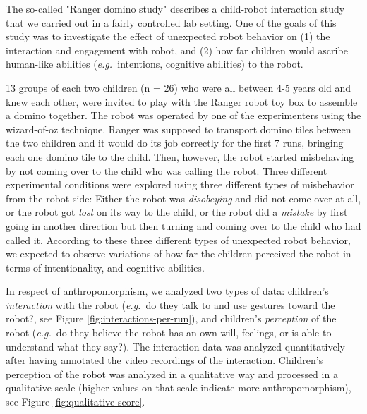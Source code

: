 \documentclass{frontiersSCNS} %
\newcommand{\eg}{{\textit{e.g.~}}}
\begin{document}
The so-called "Ranger domino study" describes a child-robot interaction study
that we carried out in a fairly controlled lab setting. One of the goals of this
study was to investigate the effect of unexpected robot behavior on (1) the
interaction and engagement with robot, and (2) how far children would ascribe
human-like abilities (\eg intentions, cognitive abilities) to the robot.

13 groups of each two children (n = 26) who were all between 4-5 years old and
knew each other, were invited to play with the Ranger
robot toy box \citep{fink2014which} to assemble a domino together. The robot
was operated by one of the experimenters using the wizard-of-oz technique.
Ranger was supposed to transport domino tiles between the two children and it
would do its job correctly for the first 7 runs, bringing each one domino tile to the child. Then, however, the
robot started misbehaving by not coming over to the child who was calling the 
robot. Three different experimental conditions were explored using three different 
types of misbehavior from the robot side:
Either the robot was \textit{disobeying} and did not come over at all, or 
the robot got \textit{lost} on its way to the child, or the robot did a 
\textit{mistake} by first going in another direction but then turning and 
coming over to the child who had called it.
According to these three different types of unexpected robot behavior, we 
expected to observe variations of how far the children perceived the 
robot in terms of intentionality, and cognitive abilities.

In respect of anthropomorphism, we analyzed two types of data: children's 
\textit{interaction} with the robot (\eg do they talk to and use gestures 
toward the robot?, see Figure \ref{fig:interactions-per-run}), and 
children's \textit{perception} of the robot (\eg do they believe the 
robot has an own will, feelings, or is able to understand what they 
say?). The interaction data was analyzed quantitatively after having 
annotated the video recordings of the interaction. Children's perception 
of the robot was analyzed in a qualitative way and processed in a 
qualitative scale (higher values on that scale indicate more 
anthropomorphism), see Figure \ref{fig:qualitative-score}.
\end{document}
